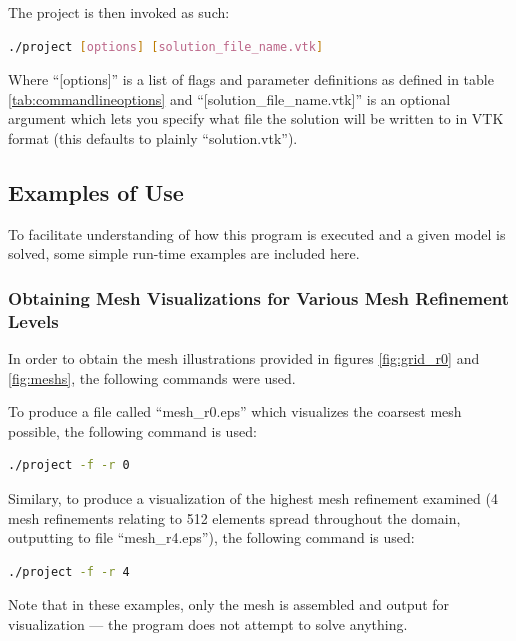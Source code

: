 \documentclass[letterpaper,10pt]{article}
\begin{document}
The project is then invoked as such:
\vspace{-6mm}
\begin{lstlisting}[numbers=none,frame=none,language=bash]
./project [options] [solution_file_name.vtk]
\end{lstlisting}
\vspace{1mm}

Where ``[options]'' is a list of flags and parameter definitions as defined in table \ref{tab:commandlineoptions} and ``[solution\_file\_name.vtk]'' is an optional argument which lets you specify what file the solution will be written to in VTK format (this defaults to plainly ``solution.vtk'').

\subsection{Examples of Use}
To facilitate understanding of how this program is executed and a given model is solved, some simple run-time examples are included here.

\subsubsection{Obtaining Mesh Visualizations for Various Mesh Refinement Levels}
In order to obtain the mesh illustrations provided in figures \ref{fig:grid_r0} and \ref{fig:meshs}, the following commands were used.

To produce a file called ``mesh\_r0.eps'' which visualizes the coarsest mesh possible, the following command is used:
\vspace{-6mm}
\begin{lstlisting}[numbers=none,frame=none,language=bash]
./project -f -r 0
\end{lstlisting}
\vspace{1mm}

Similary, to produce a visualization of the highest mesh refinement examined (4 mesh refinements relating to 512 elements spread throughout the domain, outputting to file ``mesh\_r4.eps''), the following command is used:
\vspace{-6mm}
\begin{lstlisting}[numbers=none,frame=none,language=bash]
./project -f -r 4
\end{lstlisting}
\vspace{1mm}

Note that in these examples, only the mesh is assembled and output for visualization --- the program does not attempt to solve anything.
\end{document}
